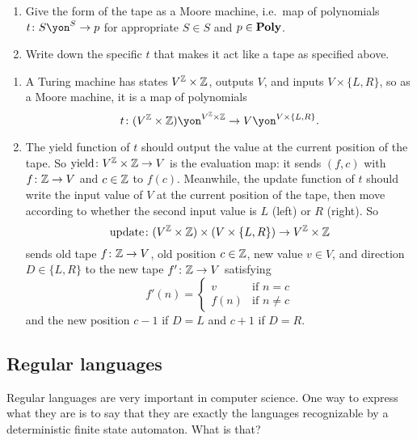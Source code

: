\documentclass[Book-Poly]{subfiles}
\begin{document}
\begin{exercise}
\begin{enumerate}
	\item Give the form of the tape as a Moore machine, i.e.\ map of polynomials $t\colon S\yon^S\to p$ for appropriate $S\in S$ and $p\in\mathbf{Poly}$.
	\item Write down the specific $t$ that makes it act like a tape as specified above.
\qedhere
\end{enumerate}
\begin{solution}
\begin{enumerate}
    \item A Turing machine has states $V^{\mathbb{Z}} \times \mathbb{Z}$, outputs $V$, and inputs $V \times \{L, R\}$, so as a Moore machine, it is a map of polynomials
    \[
        t \colon (V^\zz \times \zz)\yon^{V^\zz \times \zz} \to V\yon^{V \times \{L,R\}}.
    \]
    \item The yield function of $t$ should output the value at the current position of the tape. So $\text{yield} \colon V^{\mathbb{Z}} \times \mathbb{Z} \to V$ is the evaluation map: it sends $(f,c)$ with $f \colon \mathbb{Z} \to V$ and $c \in \mathbb{Z}$ to $f(c)$.
    Meanwhile, the update function of $t$ should write the input value of $V$ at the current position of the tape, then move according to whether the second input value is $L$ (left) or $R$ (right).
    So
    \[
        \text{update} \colon (V^{\mathbb{Z}} \times \mathbb{Z}) \times (V \times \{L,R\}) \to V^{\mathbb{Z}} \times \mathbb{Z}
    \]
    sends old tape $f \colon \mathbb{Z} \to V$, old position $c \in \mathbb{Z}$, new value $v \in V$, and direction $D \in \{L,R\}$ to the new tape $f' \colon \mathbb{Z} \to V$ satisfying
    \[
        f'(n) =
        \begin{cases}
            v & \text{if } n = c \\
            f(n) & \text{if } n \neq c
        \end{cases}
    \]
    and the new position $c-1$ if $D=L$ and $c+1$ if $D = R$.
\end{enumerate}
\end{solution}
\end{exercise}

\subsection{Regular languages}

Regular languages are very important in computer science. One way to express what they are is to say that they are exactly the languages recognizable by a deterministic finite state automaton. What is that?
\end{document}
